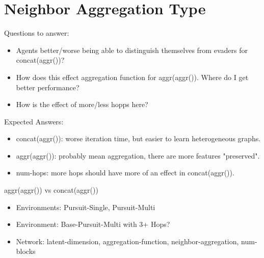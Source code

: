 \section{Neighbor Aggregation Type}
Questions to answer:
\begin{itemize}[noitemsep,nolistsep]
    \item Agents better/worse being able to distinguish themselves from evaders for concat(aggr())?
    \item How does this effect aggregation function for aggr(aggr()). Where do I get better performance?
    \item How is the effect of more/less hopps here?
\end{itemize}
Expected Answers:
\begin{itemize}[noitemsep,nolistsep]
    \item concat(aggr()): worse iteration time, but easier to learn heterogeneous graphs.
    \item aggr(aggr()): probably mean aggregation, there are more features "preserved".
    \item num-hops: more hops should have more of an effect in concat(aggr()).
\end{itemize}
aggr(aggr()) vs concat(aggr())
\begin{itemize}[noitemsep,nolistsep]
    \item Environments: Pursuit-Single, Pursuit-Multi
    \item Environment: Base-Pursuit-Multi with 3+ Hops?
    \item Network: latent-dimension, aggregation-function, neighbor-aggregation, num-blocks
\end{itemize}


